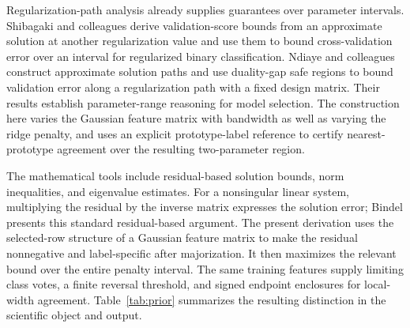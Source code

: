 \documentclass[preprint,12pt,authoryear]{elsarticle}
\begin{document}
Regularization-path analysis already supplies guarantees over parameter intervals. Shibagaki and colleagues \citeyearpar{shibagaki2015} derive validation-score bounds from an approximate solution at another regularization value and use them to bound cross-validation error over an interval for regularized binary classification. Ndiaye and colleagues \citeyearpar{ndiaye2019} construct approximate solution paths and use duality-gap safe regions to bound validation error along a regularization path with a fixed design matrix. Their results establish parameter-range reasoning for model selection. The construction here varies the Gaussian feature matrix with bandwidth as well as varying the ridge penalty, and uses an explicit prototype-label reference to certify nearest-prototype agreement over the resulting two-parameter region.

The mathematical tools include residual-based solution bounds, norm inequalities, and eigenvalue estimates. For a nonsingular linear system, multiplying the residual by the inverse matrix expresses the solution error; Bindel \citeyearpar{bindel2025} presents this standard residual-based argument. The present derivation uses the selected-row structure of a Gaussian feature matrix to make the residual nonnegative and label-specific after majorization. It then maximizes the relevant bound over the entire penalty interval. The same training features supply limiting class votes, a finite reversal threshold, and signed endpoint enclosures for local-width agreement. Table~\ref{tab:prior} summarizes the resulting distinction in the scientific object and output.
\end{document}
